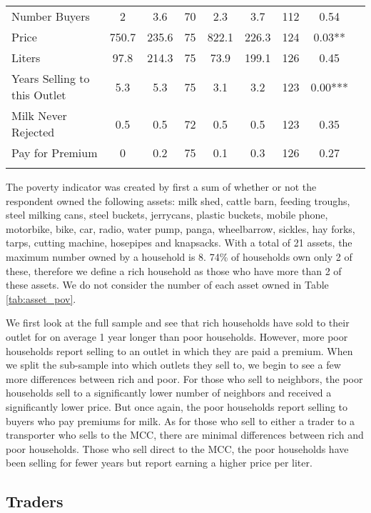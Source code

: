 \documentclass[11pt,letter,draft]{article}
\newcommand{\mcl}{\multicolumn}
\begin{document}
\begin{table}[ht]
{\begin{tabular}{l*{1}{cccccccc}}
Number Buyers&  2&  3.6&  70&  2.3&  3.7&  112&  0.54   \\
Price&  750.7&  235.6&  75&  822.1&  226.3&  124&  0.03**   \\
Liters&  97.8&  214.3&  75&  73.9&  199.1&  126&  0.45   \\
Years Selling to this Outlet&  5.3&  5.3&  75&  3.1&  3.2&  123&  0.00***   \\
Milk Never Rejected&  0.5&  0.5&  72&  0.5&  0.5&  123&  0.35  \\
Pay for Premium&  0&  0.2&  75&  0.1&  0.3&  126&  0.27  \\


\hline\hline
\mcl{7}{l}{
\footnotesize{
\parbox{20cm}{\vspace{2mm}\baselineskip=11pt}}}%
\end{tabular}
}
\end{table}
The poverty indicator was created by first a sum of whether or not the respondent owned the following assets: milk shed, cattle barn, feeding troughs, steel milking cans, steel buckets, jerrycans, plastic buckets, mobile phone, motorbike, bike, car, radio, water pump, panga, wheelbarrow, sickles, hay forks, tarps, cutting machine, hosepipes and knapsacks. With a total of 21 assets, the maximum number owned by a household is 8. 74\% of households own only 2 of these, therefore we define a rich household as those who have more than 2 of these assets. We do not consider the number of each asset owned in Table \ref{tab:asset_pov}.

We first look at the full sample and see that rich households have sold to their outlet for on average 1 year longer than poor households. However, more poor households report selling to an outlet in which they are paid a premium. When we split the sub-sample into which outlets they sell to, we begin to see a few more differences between rich and poor. For those who sell to neighbors, the poor households sell to a significantly lower number of neighbors and received a significantly lower price. But once again, the poor households report selling to buyers who pay premiums for milk. As for those who sell to either a trader to a transporter who sells to the MCC, there are minimal differences between rich and poor households. Those who sell direct to the MCC, the poor households have been selling for fewer years but report earning a higher price per liter.




\clearpage
\subsection{Traders} 
\end{document}
